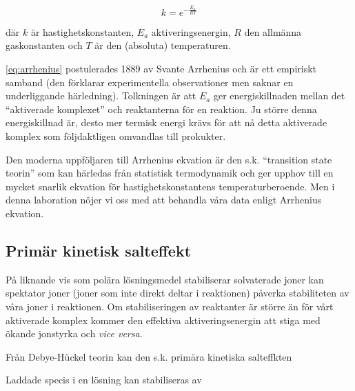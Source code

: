 \begin{equation}
  \label{eq:arrhenius}
  k = e^{-\frac{E_a}{RT}}
\end{equation}

där $k$ är hastighetskonstanten, $E_a$ aktiveringsenergin, $R$ den
allmänna gaskonstanten och $T$ är den (absoluta) temperaturen.

\cref{eq:arrhenius} postulerades 1889 av Svante Arrhenius och är ett
empiriskt samband (den förklarar experimentella observationer men saknar
en underliggande härledning). Tolkningen är att $E_a$ ger
energiskillnaden mellan det ``aktiverade komplexet'' och reaktanterna för
en reaktion. Ju större denna energiskillnad är, desto mer termisk energi
krävs för att nå detta aktiverade komplex som följdaktligen omvandlas
till prokukter.

Den moderna uppföljaren till Arrhenius ekvation är den s.k. ``transition
state teorin'' som kan härledas från statistisk termodynamik och ger
upphov till en mycket snarlik ekvation för hastighetskonstantens
temperaturberoende. Men i denna laboration nöjer vi oss med att behandla
våra data enligt Arrhenius ekvation.

\subsection{Primär kinetisk salteffekt}
På liknande vis som polära lösningsmedel stabiliserar
solvaterade joner kan spektator joner (joner som inte
direkt deltar i reaktionen) påverka stabiliteten av våra joner i
reaktionen. Om stabiliseringen av reaktanter är större än för vårt
aktiverade komplex kommer den effektiva aktiveringsenergin att stiga med
ökande jonstyrka och \emph{vice versa}.

Från Debye-Hückel teorin kan den s.k. primära kinetiska
salteffkten 


Laddade specis i en lösning kan stabiliseras av  

